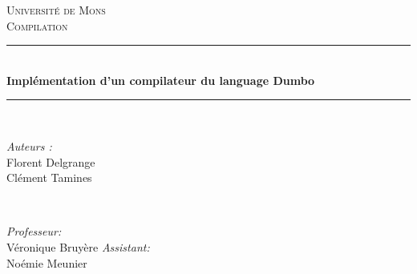 \documentclass[a4paper,10pt]{article}
\begin{document}
\begin{titlepage}

\newcommand{\HRule}{\rule{\linewidth}{0.5mm}} %

\center %
 

\textsc{\LARGE Université de Mons}\\[1.5cm] %
\textsc{\Large Compilation }\\[0.5cm] %


\HRule \\[0.4cm]
{ \huge \bfseries Implémentation d'un compilateur du language \textrm{Dumbo}}\\[0.4cm] %
\HRule \\[1.5cm]
 

\begin{minipage}{0.4\textwidth}
\begin{flushleft} \large
\emph{Auteurs :}\\
Florent Delgrange \\
Clément Tamines
\end{flushleft}
\end{minipage}
~
\begin{minipage}{0.4\textwidth}
\begin{flushright} \large
\emph{Professeur:} \\
Véronique Bruyère
\emph{Assistant:} \\
Noémie Meunier
\end{flushright}
\end{minipage}\\[4cm]



\end{titlepage}
\end{document}
